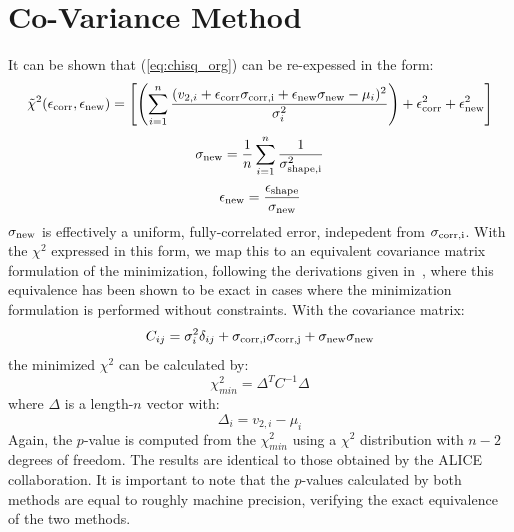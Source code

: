 \documentclass[11pt]{article}
\begin{document}
\section{Co-Variance Method}

It can be shown that (\ref{eq:chisq_org}) can be re-expessed in the form:
\begin{equation}\label{chisq_eff}
    \tilde{\chi}^2 (\epsilon_{\rm corr}, \epsilon_{\rm new}) = \left[ \left( \sum_{i=1}^{n} \frac{(v_{2, i} + \epsilon_{\rm corr} \sigma_{\rm corr, i} + \epsilon_{\rm new} \sigma_{\rm new} - \mu_i)^2}{\sigma^2_i} \right)+ \epsilon_{\rm corr}^2 + \epsilon_{\rm new}^2 \right]
\end{equation}
\begin{equation}\label{sigma_new}
    \sigma_{\rm new} = \frac{1}{n}\sum_{i=1}^{n} \frac{1}{\sigma^2_{\rm shape, i}}
\end{equation}
\begin{equation}\label{eps_new}
    \epsilon_{\rm new} = \frac{\epsilon_{\rm shape}}{\sigma_{\rm new}}
\end{equation}
$\sigma_{\rm new}$ is effectively a uniform, fully-correlated error, indepedent from $\sigma_{\rm corr, i}$. With the $\chi^2$ expressed in this form, we map this to an equivalent covariance matrix formulation of the minimization, following the derivations given in~\cite{Demortier:1999aa,Gao:2014cp}, where this equivalence has been shown to be exact in cases where the minimization formulation is performed without constraints.  With the covariance matrix:
\begin{equation}\label{covariance_matrix}
    C_{ij} = \sigma_i^2 \delta_{ij} + \sigma_{\rm corr, i} \sigma_{\rm corr, j} + \sigma_{\rm new} \sigma_{\rm new}
\end{equation}
the minimized $\chi^2$ can be calculated by:
\begin{equation}\label{cov_mat_chi2_min}
    \chi_{min}^2 = \Delta^T C^{-1} \Delta
\end{equation}
where $\Delta$ is a length-$n$ vector with:
\begin{equation}\label{delta_def}
    \Delta_i = v_{2, i} - \mu_i
\end{equation}
Again, the $p$-value is computed from the $\chi_{min}^2$ using a $\chi^2$ distribution with $n - 2$ degrees of freedom. The results are identical to those obtained by the ALICE collaboration. It is important to note that the $p$-values calculated by both methods are equal to roughly machine precision, verifying the exact equivalence of the two methods.
\end{document}

